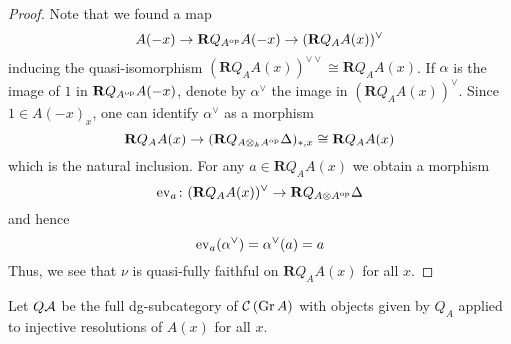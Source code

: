 \begin{proof}


  Note that we found a map
  \begin{displaymath}
    A(-x) \to \mathbf{R}Q_{A^{\operatorname{op}}} A(-x) \to ( \mathbf{R}Q_A A(x) )^\vee 
  \end{displaymath}
  inducing the quasi-isomorphism \((\mathbf{R}Q_A A(x))^{\vee \vee} \cong \mathbf{R}Q_A A(x)\).
  If \(\alpha\) is the image of \(1\) in \(\mathbf{R}Q_{A^{\operatorname{op}}} A(-x)\), denote by \(\alpha^\vee\) the image in \((\mathbf{R}Q_A A(x))^\vee\).
  Since \(1 \in A(-x)_x\), one can identify \(\alpha^\vee\) as a morphism
  \[
  \mathbf{R}Q_A A(x) \to (\mathbf{R}Q_{A \otimes_k A^{\operatorname{op}}} \Delta)_{\ast,x} \cong \mathbf{R}Q_A A(x)
  \]
  which is the natural inclusion.
  For any \(a \in \mathbf{R}Q_A A(x)\) we obtain a morphism
  \[\operatorname{ev}_a \colon (\mathbf{R}Q_A A(x))^\vee \to \mathbf{R}Q_{A \otimes A^{\operatorname{op}}} \Delta \]
  and hence
  \[\operatorname{ev}_a(\alpha^\vee) = \alpha^\vee(a) = a\]
  Thus, we see that \(\nu\) is quasi-fully faithful on \(\mathbf{R}Q_A A(x)\) for all \(x\). 
\end{proof}

\begin{definition}
  Let \(Q\mathcal{A}\) be the full dg-subcategory of \(\mathcal{C}\left(\operatorname{Gr}A\right)\) with objects given by \(Q_A\) applied to injective resolutions of \(A(x)\) for all \(x\). 
\end{definition}


